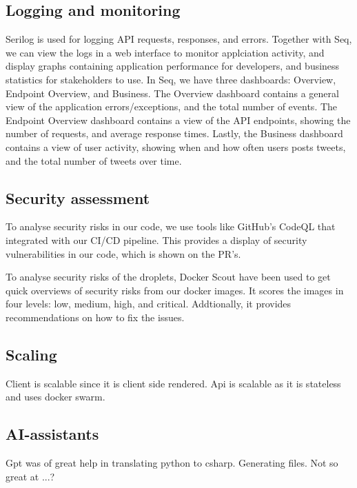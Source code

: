 \subsection{Logging and monitoring}
Serilog is used for logging API requests, responses, and errors.
Together with Seq, we can view the logs in a web interface to monitor 
applciation activity, and display graphs containing application performance 
for developers, and business statistics for stakeholders to use.
In Seq, we have three dashboards: Overview, Endpoint Overview, and Business.
The Overview dashboard contains a general view of the application 
errors/exceptions, and the total number of events.
The Endpoint Overview dashboard contains a view of the API endpoints,
showing the number of requests, and average response times.
Lastly, the Business dashboard contains a view of user activity,
showing when and how often users posts tweets, and the total number of tweets over time.


\subsection{Security assessment}
To analyse security risks in our code, we use tools like GitHub's CodeQL\cite{codeql} that 
integrated with our CI/CD pipeline.
This provides a display of security vulnerabilities in our code,
which is shown on the PR's.

To analyse security risks of the droplets, Docker Scout have been used to get
quick overviews of security risks from our docker images.
It scores the images in four levels: low, medium, high, and critical.
Addtionally, it provides recommendations on how to fix the issues.

\subsection{Scaling}

Client is scalable since it is client side rendered.
Api is scalable as it is stateless and uses docker swarm.

\subsection{AI-assistants}

Gpt was of great help in translating python to csharp.
Generating files.
Not so great at ...?